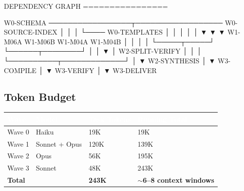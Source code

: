 \documentclass[11pt,letterpaper]{article}
\newcommand{\tableheader}[1]{\textbf{\sffamily\textcolor{white}{#1}}}
\begin{document}
\begin{asciibox}
DEPENDENCY GRAPH
================

  W0-SCHEMA ─────────────────┬────────────────── W0-SOURCE-INDEX
         │                   │                          │
         └──── W0-TEMPLATES  │                          │
                    │        │                          │
                    ▼        ▼                          ▼
              W1-M06A    W1-M06B      W1-M04A        W1-M04B
                 │           │           │               │
                 └─────┬─────┘           └──────┬────────┘
                       │                        │
                       ▼                        │
                 W2-SPLIT-VERIFY                │
                       │                        │
                       └──────────┬─────────────┘
                                  │
                                  ▼
                            W2-SYNTHESIS
                                  │
                                  ▼
                            W3-COMPILE
                                  │
                                  ▼
                            W3-VERIFY
                                  │
                                  ▼
                            W3-DELIVER
\end{asciibox}

\subsection{Token Budget}

\begin{center}
\begin{tabularx}{\textwidth}{L{3cm}C{2cm}C{2cm}C{2.5cm}}
\toprule
{}
\tableheader{Wave} & \tableheader{Model} & \tableheader{Task Tokens} & \tableheader{Running Total} \\
\midrule
Wave 0 & Haiku & 19K & 19K \\
Wave 1 & Sonnet + Opus & 120K & 139K \\
Wave 2 & Opus & 56K & 195K \\
Wave 3 & Sonnet & 48K & 243K \\
\midrule
\textbf{Total} & & \textbf{243K} & \textbf{$\sim$6--8 context windows} \\
\bottomrule
\end{tabularx}
\end{center}

\end{document}
